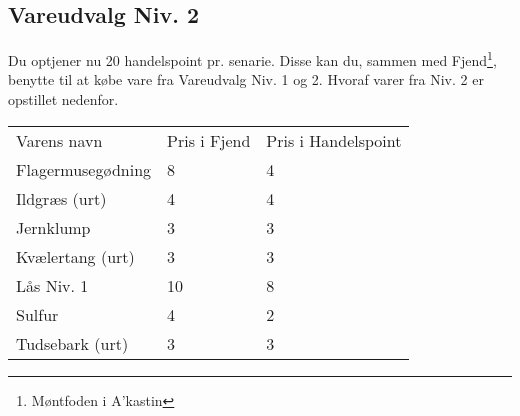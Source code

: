 \subsection*{Vareudvalg Niv. 2}
Du optjener nu 20 handelspoint pr. senarie. Disse kan du, sammen med Fjend\footnote{Møntfoden i A'kastin}, benytte til at købe vare fra Vareudvalg Niv. 1 og 2. Hvoraf varer fra Niv. 2 er opstillet nedenfor.
\begin{table}[H]
    \centering
    \begin{tabular}{|p{}|p{}|p{}|}
    \hline
    \rowcolor{cerulean!80}
    \multicolumn{3}{c}{Vareudvalg Niv. 2}\\
    \hline
    \rowcolor{cerulean!40}
         Varens navn & Pris i Fjend & Pris i Handelspoint \\\hline
         Flagermusegødning & 8 & 4\\\hline
         Ildgræs (urt) & 4 & 4\\\hline
         Jernklump & 3 & 3\\\hline
         Kvælertang (urt) & 3 & 3\\\hline
         Lås Niv. 1 & 10 & 8\\\hline
         Sulfur & 4 & 2\\\hline
         Tudsebark (urt) & 3 & 3\\\hline
    \end{tabular}
    \end{table}